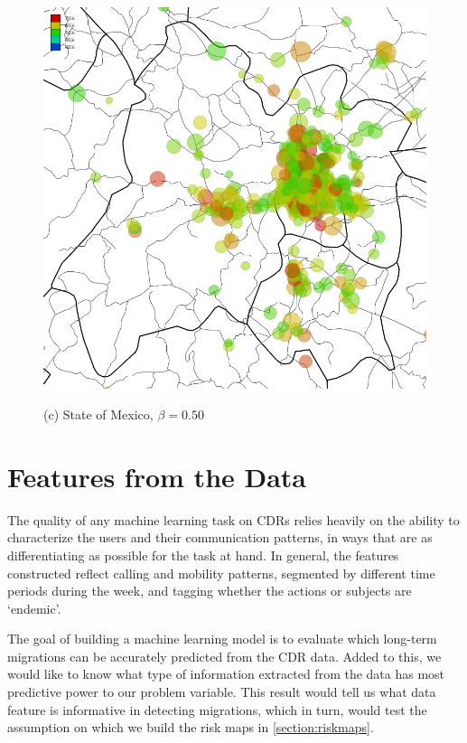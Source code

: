 \begin{figure}[p]
	\begin{minipage}{.6\linewidth}
		\centering
		\includegraphics[width=\columnwidth]
		{figures/estado_mexico_usuarios_volumen_circulos_allday_beta--50_min_volume--80_mexico_/estado_mexico_usuarios_volumen_circulos_allday_beta--50_min_volume--80_mexico_}

		(c) State of Mexico, $\beta = 0.50$
	\end{minipage}
\end{figure}



\section{Features from the Data}

The quality of any machine learning task on CDRs relies heavily on the ability to characterize the users and their communication patterns, in ways that are as differentiating as possible for the task at hand.
In general, the features constructed reflect calling and mobility patterns,
segmented by different time periods during the week, and tagging whether the actions or subjects are `endemic'.

The goal of building a machine learning model is to evaluate which long-term migrations can be accurately predicted from the CDR data. Added to this, we would like to know what type of information extracted from the data has most predictive power to our problem variable. This result would tell us what data feature is informative in detecting migrations, which in turn, would test the assumption on which we build the risk maps in \cref{section:riskmaps}.

